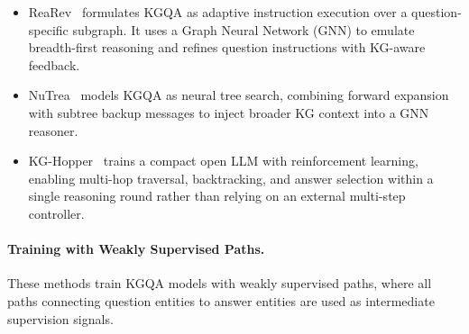 \documentclass{article}
\begin{document}
\begin{itemize}
    \item ReaRev~\citep{mavromatis_rearev_2022} formulates KGQA as adaptive instruction execution over a question-specific subgraph. It uses a Graph Neural Network (GNN) to emulate breadth-first reasoning and refines question instructions with KG-aware feedback.

    \item NuTrea~\citep{choi_nutrea_2023} models KGQA as neural tree search, combining forward expansion with subtree backup messages to inject broader KG context into a GNN reasoner.

    \item KG-Hopper~\citep{wang_kg-hopper_2026} trains a compact open LLM with reinforcement learning, enabling multi-hop traversal, backtracking, and answer selection within a single reasoning round rather than relying on an external multi-step controller.
\end{itemize}

\paragraph{Training with Weakly Supervised Paths.}
These methods train KGQA models with weakly supervised paths, where all paths connecting question entities to answer entities are used as intermediate supervision signals.
\end{document}
